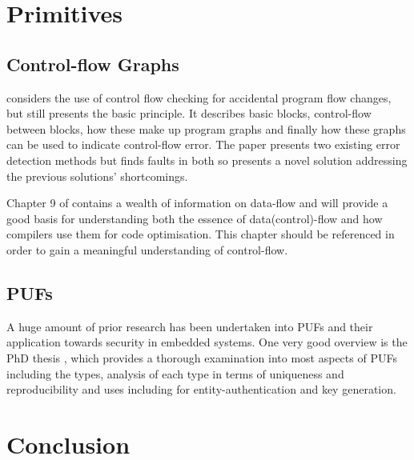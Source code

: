 \section{Primitives}

\subsection{Control-flow Graphs}

\cite{Goloubeva2003} considers the use of control flow checking for accidental program flow changes, but still presents the basic principle. It describes basic blocks, control-flow between blocks, how these make up program graphs and finally how these graphs can be used to indicate control-flow error. The paper presents two existing error detection methods but finds faults in both so presents a novel solution addressing the previous solutions' shortcomings.

Chapter 9 of \cite{AhoAlfredV.2014C:pt} contains a wealth of information on data-flow and will provide a good basis for understanding both the essence of data(control)-flow and how compilers use them for code optimisation. This chapter should be referenced in order to gain a meaningful understanding of control-flow.


\subsection{PUFs}

A huge amount of prior research has been undertaken into PUFs and their application towards security in embedded systems. One very good overview is the PhD thesis \cite{Maes2012}, which provides a thorough examination into most aspects of PUFs including the types, analysis of each type in terms of uniqueness and reproducibility and uses including for entity-authentication and key generation.

\section{Conclusion}

